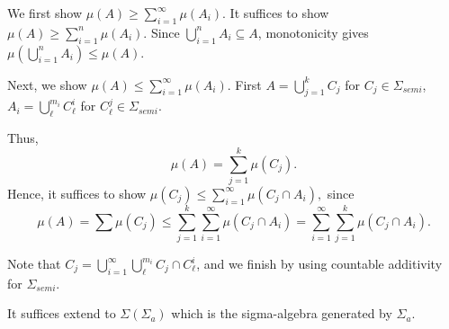 \documentclass[11pt]{scrartcl}
\begin{document}
We first show $\mu(A) \ge \sum_{i=1}^{\infty} \mu(A_i)$.  It suffices to show $\mu(A) \ge \sum_{i=1}^n \mu(A_i)$.  Since $\bigcup_{i=1}^n A_i \subseteq A$, monotonicity gives $\mu\left (\bigcup_{i=1}^n A_i\right ) \le \mu(A)$.

Next, we show $\mu(A) \le \sum_{i=1}^{\infty} \mu(A_i)$.  
First $A = \bigcup_{j=1}^k C_j$ for $C_j\in \Sigma_{semi}$, 
$A_i = \bigcup_{\ell}^{m_i} C_{\ell}^i$ for $C_{\ell}^j \in \Sigma_{semi}$.

Thus, $$\mu(A) = \sum_{j=1}^k \mu(C_j).$$
Hence, it suffices to show $\mu(C_j) \le \sum_{i=1}^{\infty} \mu(C_j \cap A_i),$ since 
$$\mu(A) = \sum \mu(C_j) \le \sum_{j=1}^k \sum_{i=1}^{\infty} \mu(C_j \cap A_i) = \sum_{i=1}^{\infty}\sum_{j=1}^k \mu(C_j \cap A_i).$$

Note that $C_j = \bigcup_{i=1}^\infty \bigcup_{\ell}^{m_i}C_j \cap C_\ell^i$, and we finish by using countable additivity for $\Sigma_{semi}$.

It suffices extend to $\Sigma(\Sigma_a)$ which is the sigma-algebra generated by $\Sigma_a$.  
\end{document}
